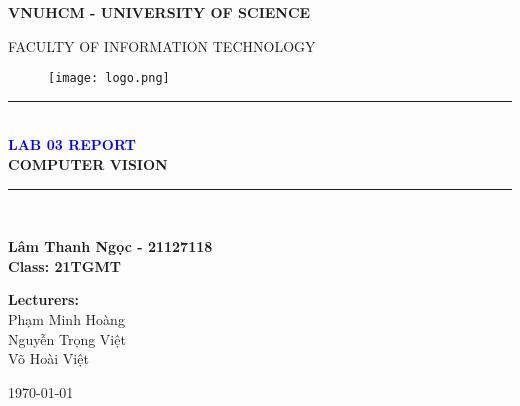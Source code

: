 \documentclass{report}
\newcommand\HRule{\rule{\textwidth}{1pt}}
\begin{document}
\begin{titlepage}


\begin{center}
\textsc{\Large \textbf{VNUHCM - UNIVERSITY OF SCIENCE}}\\

\bigskip

\textsc{\Large FACULTY OF INFORMATION TECHNOLOGY}\\

\bigskip

\begin{figure}[!h]
    \centering
    \texttt{[image: logo.png]}
\end{figure}

\HRule \\[0.4cm]
{\huge\bfseries \textcolor{blue}{LAB 03 REPORT}}\\[0.4cm]
{\Large\bfseries COMPUTER VISION}
\HRule \\[1cm]

\begin{center}
    \textbf{\Large Lâm Thanh Ngọc - 21127118} \\
    \medskip
    \Large{\textbf{Class: 21TGMT}}\\[4cm]
\end{center}

\begin{center}
    \textbf{\Large Lecturers: \\[0.2cm]}
    \Large{Phạm Minh Hoàng \\[0.2cm] Nguyễn Trọng Việt \\ [0.2cm] Võ Hoài Việt}
\end{center}
\vfill


{\today}
\end{center}
\end{titlepage}
\end{document}
